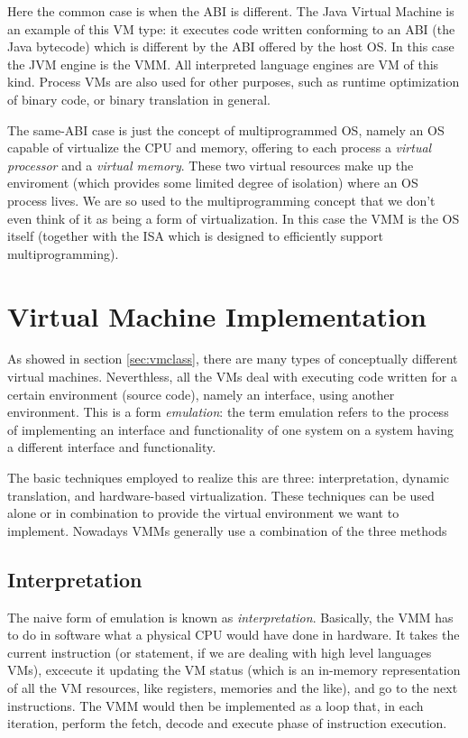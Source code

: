 Here the common case is when the ABI is different. The Java Virtual Machine is an example of this VM type: it executes code written 
conforming to an ABI (the Java bytecode) which is different by the ABI offered by the host OS. In this case the JVM engine is the VMM.
All interpreted language engines are VM of this kind. Process VMs are also used for other purposes, such as runtime optimization
of binary code, or binary translation in general.

The same-ABI case is just the concept of multiprogrammed OS, namely an OS capable of virtualize the CPU and
memory, offering to each process a \emph{virtual processor} and a \emph{virtual memory}. These two virtual resources make up
the enviroment (which provides some limited degree of isolation) where an OS process lives. We are so used to the multiprogramming
concept that we don't even think of it as being a form of virtualization. In this case the VMM is the OS itself (together with
the ISA which is designed to efficiently support multiprogramming).


\section{Virtual Machine Implementation}
\label{sec:vmimpl}

As showed in section \ref{sec:vmclass}, there are many types of conceptually different virtual machines.
Neverthless, all the VMs deal with executing code written for a certain environment (source code), namely an interface, using another
environment. This is a form \emph{emulation}: the term emulation refers to the process of implementing an interface and functionality
of one system on a system having a different interface and functionality. %

The basic techniques employed to realize this are three: interpretation, dynamic translation, and hardware-based virtualization.
These techniques can be used alone or in combination to provide the virtual environment we want to implement.
Nowadays VMMs generally use a combination of the three methods


\subsection{Interpretation}
The naive form of emulation is known as \emph{interpretation}.
Basically, the VMM has to do in software what a physical CPU would have done
in hardware. It takes the current instruction (or statement, if we are dealing with high level languages VMs), excecute it updating the
VM status (which is an in-memory representation of all the VM resources, like registers, memories and the like), and go to the next
instructions. The VMM would then be implemented as a loop that, in each iteration, perform the fetch, decode and execute phase of
instruction execution.

